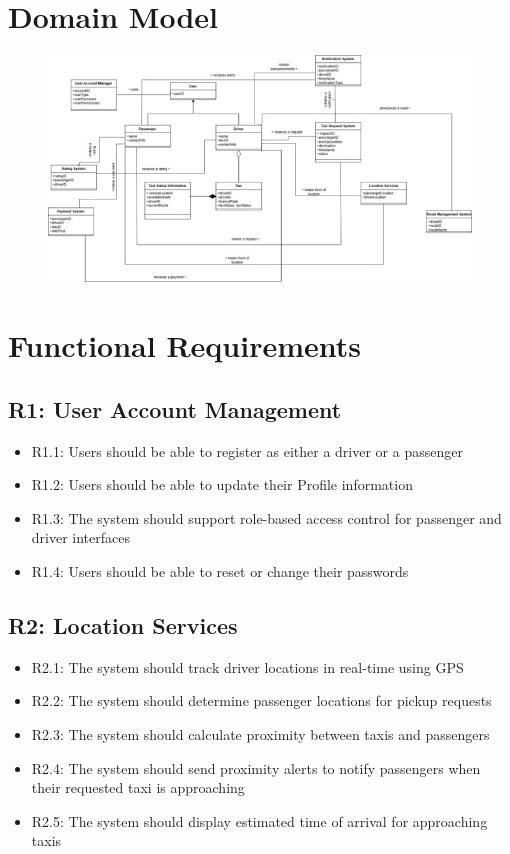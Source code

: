 \documentclass[a4paper,12pt]{article}
\begin{document}
\section{Domain Model}

\begin{figure}[H]
  \centering
  \includegraphics[width=1\textwidth]{Domain Model.jpg} 
\end{figure}

\section{Functional Requirements}

\subsection*{R1: User Account Management}
\begin{itemize}
    \item R1.1: Users should be able to register as either a driver or a passenger
    \item R1.2: Users should be able to update their Profile information
    \item R1.3: The system should support role-based access control for passenger and driver interfaces
    \item R1.4: Users should be able to reset or change their passwords
\end{itemize}

\subsection*{R2: Location Services}
\begin{itemize}
    \item R2.1: The system should track driver locations in real-time using GPS
    \item R2.2: The system should determine passenger locations for pickup requests
    \item R2.3: The system should calculate proximity between taxis and passengers
    \item R2.4: The system should send proximity alerts to notify passengers when their requested taxi is approaching
    \item R2.5: The system should display estimated time of arrival for approaching taxis 
\end{itemize}
\end{document}
